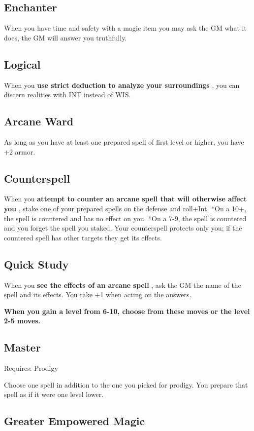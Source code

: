 \subsection{Enchanter}

When you have time and safety with a magic item you may ask the GM what it does, the GM will answer you truthfully.
\subsection{Logical}

When you \textbf{use strict deduction to analyze your surroundings}
, you can discern realities with INT instead of WIS.
\subsection{Arcane Ward}

As long as you have at least one prepared spell of first level or higher, you have +2 armor.
\subsection{Counterspell}

When you \textbf{attempt to counter an arcane spell that will otherwise affect you}
, stake one of your prepared spells on the defense and roll+Int. *On a 10+, the spell is countered and has no effect on you. *On a 7-9, the spell is countered and you forget the spell you staked. Your counterspell protects only you; if the countered spell has other targets they get its effects.
\subsection{Quick Study}

When you \textbf{see the effects of an arcane spell}
, ask the GM the name of the spell and its effects. You take +1 when acting on the answers.

\vspace{\baselineskip}
{\bfseries When you gain a level from 6-10, choose from these moves or the level 2-5 moves.}
\subsection{Master}

Requires: Prodigy

Choose one spell in addition to the one you picked for prodigy. You prepare that spell as if it were one level lower.
\subsection{Greater Empowered Magic}

